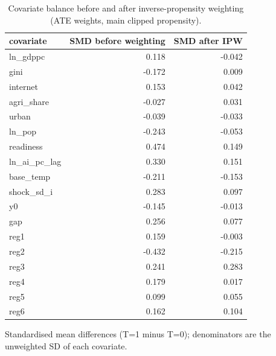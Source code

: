 \begin{table}[htbp]
\centering
\caption{Covariate balance before and after inverse-propensity weighting (ATE weights, main clipped propensity).}
\label{tab:balance}
\begin{tabular}{lrr}
\toprule
covariate & SMD before weighting & SMD after IPW \\
\midrule
ln\_gdppc & 0.118 & -0.042 \\
gini & -0.172 & 0.009 \\
internet & 0.153 & 0.042 \\
agri\_share & -0.027 & 0.031 \\
urban & -0.039 & -0.033 \\
ln\_pop & -0.243 & -0.053 \\
readiness & 0.474 & 0.149 \\
ln\_ai\_pc\_lag & 0.330 & 0.151 \\
base\_temp & -0.211 & -0.153 \\
shock\_sd\_i & 0.283 & 0.097 \\
y0 & -0.145 & -0.013 \\
gap & 0.256 & 0.077 \\
reg1 & 0.159 & -0.003 \\
reg2 & -0.432 & -0.215 \\
reg3 & 0.241 & 0.283 \\
reg4 & 0.179 & 0.017 \\
reg5 & 0.099 & 0.055 \\
reg6 & 0.162 & 0.104 \\
\bottomrule
\end{tabular}
\par\smallskip\footnotesize Standardised mean differences (T=1 minus T=0); denominators are the unweighted SD of each covariate.
\end{table}

